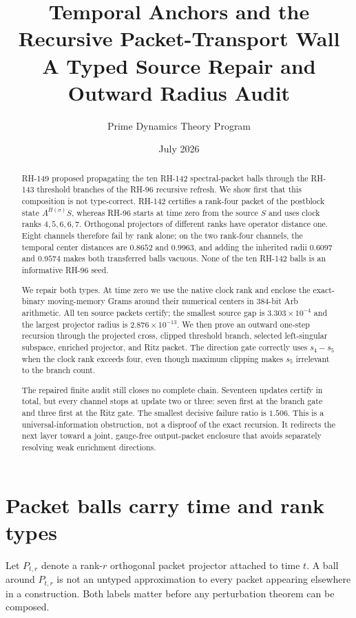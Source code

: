 \documentclass[12pt]{article}
\title{Temporal Anchors and the Recursive Packet-Transport Wall\\\large A Typed Source Repair and Outward Radius Audit}
\author{Prime Dynamics Theory Program}
\date{July 2026}
\begin{document}
\maketitle

\begin{abstract}
RH-149 proposed propagating the ten RH-142 spectral-packet balls through the
RH-143 threshold branches of the RH-96 recursive refresh.  We show first that
this composition is not type-correct.  RH-142 certifies a rank-four packet of
the postblock state $A^{H(\sigma)}S$, whereas RH-96 starts at time zero from
the source $S$ and uses clock ranks $4,5,6,6,7$.  Orthogonal projectors of
different ranks have operator distance one.  Eight channels therefore fail
by rank alone; on the two rank-four channels, the temporal center distances
are $0.8652$ and $0.9963$, and adding the inherited radii $0.6097$ and
$0.9574$ makes both transferred balls vacuous.  None of the ten RH-142 balls
is an informative RH-96 seed.

We repair both types.  At time zero we use the native clock rank and enclose
the exact-binary moving-memory Grams around their numerical centers in
384-bit Arb arithmetic.  All ten source packets certify; the smallest source
gap is $3.303\times10^{-4}$ and the largest projector radius is
$2.876\times10^{-13}$.  We then prove an outward one-step recursion through
the projected cross, clipped threshold branch, selected left-singular
subspace, enriched projector, and Ritz packet.  The direction gate correctly
uses $s_4-s_5$ when the clock rank exceeds four, even though maximum clipping
makes $s_5$ irrelevant to the branch count.

The repaired finite audit still closes no complete chain.  Seventeen updates
certify in total, but every channel stops at update two or three: seven first
at the branch gate and three first at the Ritz gate.  The smallest decisive
failure ratio is $1.506$.  This is a universal-information obstruction, not a
disproof of the exact recursion.  It redirects the next layer toward a joint,
gauge-free output-packet enclosure that avoids separately resolving weak
enrichment directions.
\end{abstract}

\section{Packet balls carry time and rank types}
Let $P_{t,r}$ denote a rank-$r$ orthogonal packet projector attached to time
$t$.  A ball around $P_{t,r}$ is not an untyped approximation to every packet
appearing elsewhere in a construction.  Both labels matter before any
perturbation theorem can be composed.
\end{document}
